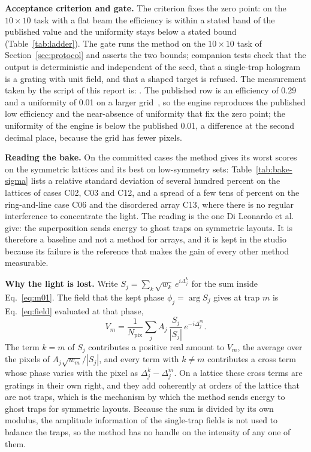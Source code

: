 \textbf{Acceptance criterion and gate.} The criterion fixes the zero point: on the $10\times10$ task with a flat beam the efficiency is within a stated band of the published value and the uniformity stays below a stated bound (Table~\ref{tab:ladder}). The gate runs the method on the $10\times10$ task of Section~\ref{sec:protocol} and asserts the two bounds; companion tests check that the output is deterministic and independent of the seed, that a single-trap hologram is a grating with unit field, and that a shaped target is refused. The measurement taken by the script of this report is: . The published row is an efficiency of 0.29 and a uniformity of 0.01 on a larger grid~\cite{dileonardo}, so the engine reproduces the published low efficiency and the near-absence of uniformity that fix the zero point; the uniformity of the engine is below the published 0.01, a difference at the second decimal place, because the grid has fewer pixels.

\textbf{Reading the bake.} On the committed cases the method gives its worst scores on the symmetric lattices and its best on low-symmetry sets: Table~\ref{tab:bake-sigma} lists a relative standard deviation of several hundred percent on the lattices of cases C02, C03 and C12, and a spread of a few tens of percent on the ring-and-line case C06 and the disordered array C13, where there is no regular interference to concentrate the light. The reading is the one Di Leonardo et al. give: the superposition sends energy to ghost traps on symmetric layouts. It is therefore a baseline and not a method for arrays, and it is kept in the studio because its failure is the reference that makes the gain of every other method measurable.

\textbf{Why the light is lost.} Write $S_j=\sum_k\sqrt{w_k}\,e^{i\Delta_j^k}$ for the sum inside Eq.~\eqref{eq:m01}. The field that the kept phase $\phi_j=\arg S_j$ gives at trap $m$ is Eq.~\eqref{eq:field} evaluated at that phase,
\begin{equation}
V_m=\frac1{N_{\mathrm{pix}}}\sum_jA_j\,\frac{S_j}{|S_j|}\,e^{-i\Delta_j^m}.
\label{eq:m01-field}
\end{equation}
The term $k=m$ of $S_j$ contributes a positive real amount to $V_m$, the average over the pixels of $A_j\sqrt{w_m}/|S_j|$, and every term with $k\neq m$ contributes a cross term whose phase varies with the pixel as $\Delta_j^k-\Delta_j^m$. On a lattice these cross terms are gratings in their own right, and they add coherently at orders of the lattice that are not traps, which is the mechanism by which the method sends energy to ghost traps for symmetric layouts. Because the sum is divided by its own modulus, the amplitude information of the single-trap fields is not used to balance the traps, so the method has no handle on the intensity of any one of them.

